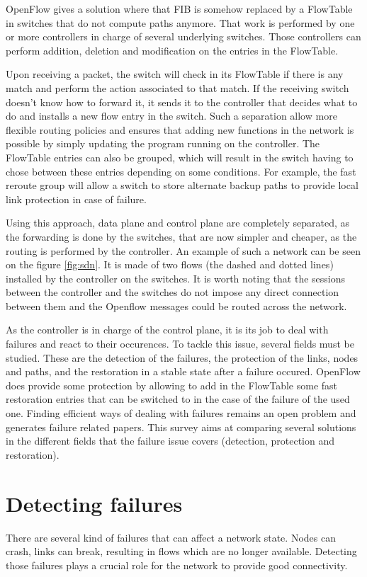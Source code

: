 \documentclass[]{IEEEtran}
\begin{document}
OpenFlow gives a solution where that FIB is somehow replaced by a FlowTable in switches that do not compute paths anymore. That work is performed by one or more controllers in charge of several underlying switches. Those controllers can perform addition, deletion and modification on the entries in the FlowTable.

Upon receiving a packet, the switch will check in its FlowTable if there is any match and perform the action associated to that match. If the receiving switch doesn't know how to forward it, it sends it to the controller that decides what to do and installs a new flow entry in the switch. Such a separation allow more flexible routing policies and ensures that adding new functions in the network is possible by simply updating the program running on the controller. The FlowTable entries can also be grouped, which will result in the switch having to chose between these entries depending on some conditions. For example, the fast reroute group will allow a switch to store alternate backup paths to provide local link protection in case of failure.

Using this approach, data plane and control plane are completely separated, as the forwarding is done by the switches, that are now simpler and cheaper, as the routing is performed by the controller. An example of such a network can be seen on the figure \ref{fig:sdn}. It is made of two flows (the dashed and dotted lines) installed by the controller on the switches. It is worth noting that the sessions between the controller and the switches do not impose any direct connection between them and the Openflow messages could be routed across the network.

As the controller is in charge of the control plane, it is its job to deal with failures and react to their occurences. To tackle this issue, several fields must be studied. These are the detection of the failures, the protection of the links, nodes and paths, and the restoration in a stable state after a failure occured. OpenFlow does provide some protection by allowing to add in the FlowTable some fast restoration entries that can be switched to in the case of the failure of the used one. Finding efficient ways of dealing with failures remains an open problem and generates failure related papers. This survey aims at comparing several solutions in the different fields that the failure issue covers (detection, protection and restoration).

\section{Detecting failures}
There are several kind of failures that can affect a network state. Nodes can crash, links can break, resulting in flows which are no longer available. Detecting those failures plays a crucial role for the network to provide good connectivity.
\end{document}
